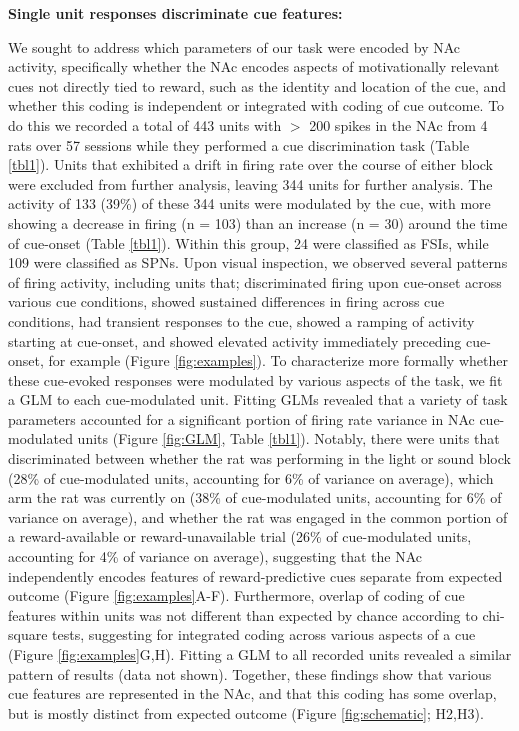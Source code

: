\documentclass[11pt]{article}
\begin{document}
{\bf Single unit responses discriminate cue features:}

We sought to address which parameters of our task were encoded by NAc activity, specifically whether the NAc encodes aspects of motivationally relevant cues not directly tied to reward, such as the identity and location of the cue, and whether this coding is independent or integrated with coding of cue outcome. To do this we recorded a total of 443 units with $>$ 200 spikes in the NAc from 4 rats over 57 sessions while they performed a cue discrimination task (Table \ref{tbl1}). Units that exhibited a drift in firing rate over the course of either block were excluded from further analysis, leaving 344 units for further analysis. The activity of 133 (39\%) of these 344 units were modulated by the cue, with more showing a decrease in firing (n =  103) than an increase (n = 30) around the time of cue-onset (Table \ref{tbl1}). Within this group, 24 were classified as FSIs, while 109 were classified as SPNs. Upon visual inspection, we observed several patterns of firing activity, including units that; discriminated firing upon cue-onset across various cue conditions, showed sustained differences in firing across cue conditions, had transient responses to the cue, showed a ramping of activity starting at cue-onset, and showed elevated activity immediately preceding cue-onset, for example (Figure \ref{fig:examples}). To characterize more formally whether these cue-evoked responses were modulated by various aspects of the task, we fit a GLM to each cue-modulated unit. Fitting GLMs revealed that a variety of task parameters accounted for a significant portion of firing rate variance in NAc cue-modulated units (Figure \ref{fig:GLM}, Table \ref{tbl1}). Notably, there were units that discriminated between whether the rat was performing in the light or sound block (28\% of cue-modulated units, accounting for 6\% of variance on average), which arm the rat was currently on (38\% of cue-modulated units, accounting for 6\% of variance on average), and whether the rat was engaged in the common portion of a reward-available or reward-unavailable trial (26\% of cue-modulated units, accounting for 4\% of variance on average), suggesting that the NAc independently encodes features of reward-predictive cues separate from expected outcome (Figure \ref{fig:examples}A-F). Furthermore, overlap of coding of cue features within units was not different than expected by chance according to chi-square tests, suggesting for integrated coding across various aspects of a cue (Figure \ref{fig:examples}G,H). Fitting a GLM to all recorded units revealed a similar pattern of results (data not shown). Together, these findings show that various cue features are represented in the NAc, and that this coding has some overlap, but is mostly distinct from expected outcome (Figure \ref{fig:schematic}; H2,H3).
\end{document}

